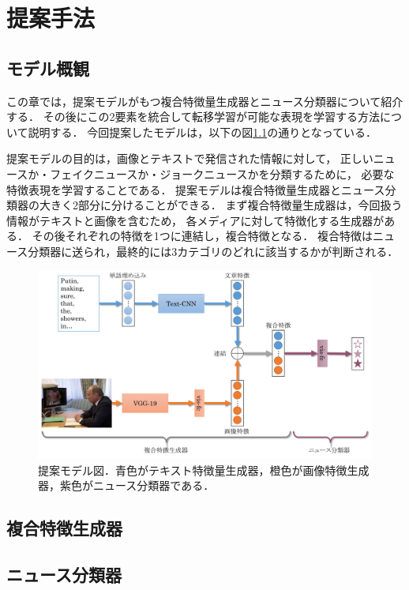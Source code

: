 %
\chapter{提案手法}
%
\section{モデル概観}
この章では，提案モデルがもつ複合特徴量生成器とニュース分類器について紹介する．
その後にこの2要素を統合して転移学習が可能な表現を学習する方法について説明する．
今回提案したモデルは，以下の図\ref{fig:model}の通りとなっている．

提案モデルの目的は，画像とテキストで発信された情報に対して，
正しいニュースか・フェイクニュースか・ジョークニュースかを分類するために，
必要な特徴表現を学習することである．
提案モデルは複合特徴量生成器とニュース分類器の大きく2部分に分けることができる．
まず複合特徴量生成器は，今回扱う情報がテキストと画像を含むため，
各メディアに対して特徴化する生成器がある．
その後それぞれの特徴を1つに連結し，複合特徴となる．
複合特徴はニュース分類器に送られ，最終的には3カテゴリのどれに該当するかが判断される．
% 
\begin{figure}[h]
    \centering
    \includegraphics[width=\linewidth]{images/methodology.pdf}
    \caption{提案モデル図．青色がテキスト特徴量生成器，橙色が画像特徴生成器，紫色がニュース分類器である．}
    \label{fig:model}
\end{figure}

%
\section{複合特徴生成器}
%

%
\section{ニュース分類器}
%




%
%
\newpage
%
%
%
%
%
%
%
%
%
%
% 